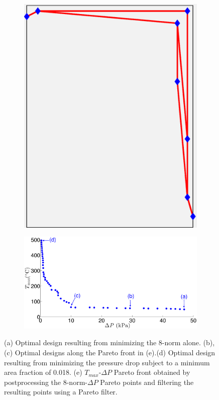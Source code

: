 \documentclass[11pt,letterpaper]{article}
\begin{document}
\begin{figure}[!h]
\begin{subfigure}{0.2\textwidth}
\includegraphics[width=\linewidth]{parallelTwoPareto_sim60_minP_Aminp018.eps}
\caption{}
\end{subfigure}

\begin{subfigure}{0.8\textwidth}
\includegraphics[width=\linewidth]{parallelTwoPareto_60pts.eps}
\caption{}
\end{subfigure}
\caption{(a) Optimal design resulting from minimizing the 8-norm alone. (b), (c) Optimal designs along the Pareto front in (e).(d) Optimal design resulting from minimizing the pressure drop subject to a minimum area fraction of 0.018. (e) $T_{max}$-$\Delta P$ Pareto front obtained by postprocessing the 8-norm-$\Delta P$ Pareto points and filtering the resulting points using a Pareto filter. }
\end{figure}
\end{document}
